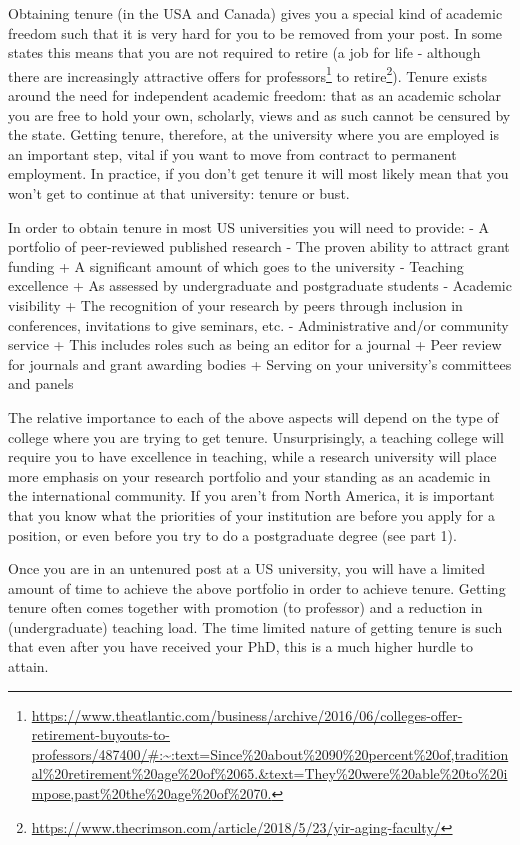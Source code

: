 \documentclass[
]{krantz}
\renewcommand{\href}[2]{#2\footnote{\url{#1}}}
\begin{document}
Obtaining tenure (in the USA and Canada) gives you a special kind of academic freedom such that it is very hard for you to be removed from your post. In some states this means that you are not required to retire (a job for life - although there are \href{https://www.theatlantic.com/business/archive/2016/06/colleges-offer-retirement-buyouts-to-professors/487400/\#:~:text=Since\%20about\%2090\%20percent\%20of,traditional\%20retirement\%20age\%20of\%2065.\&text=They\%20were\%20able\%20to\%20impose,past\%20the\%20age\%20of\%2070.}{increasingly attractive offers for professors} to \href{https://www.thecrimson.com/article/2018/5/23/yir-aging-faculty/}{retire}). Tenure exists around the need for independent academic freedom: that as an academic scholar you are free to hold your own, scholarly, views and as such cannot be censured by the state. Getting tenure, therefore, at the university where you are employed is an important step, vital if you want to move from contract to permanent employment. In practice, if you don't get tenure it will most likely mean that you won't get to continue at that university: tenure or bust.

In order to obtain tenure in most US universities you will need to provide:
- A portfolio of peer-reviewed published research
- The proven ability to attract grant funding
+ A significant amount of which goes to the university
- Teaching excellence
+ As assessed by undergraduate and postgraduate students
- Academic visibility
+ The recognition of your research by peers through inclusion in conferences, invitations to give seminars, etc.
- Administrative and/or community service
+ This includes roles such as being an editor for a journal
+ Peer review for journals and grant awarding bodies
+ Serving on your university's committees and panels

The relative importance to each of the above aspects will depend on the type of college where you are trying to get tenure. Unsurprisingly, a teaching college will require you to have excellence in teaching, while a research university will place more emphasis on your research portfolio and your standing as an academic in the international community. If you aren't from North America, it is important that you know what the priorities of your institution are before you apply for a position, or even before you try to do a postgraduate degree (see part 1).

Once you are in an untenured post at a US university, you will have a limited amount of time to achieve the above portfolio in order to achieve tenure. Getting tenure often comes together with promotion (to professor) and a reduction in (undergraduate) teaching load. The time limited nature of getting tenure is such that even after you have received your PhD, this is a much higher hurdle to attain.
\end{document}
